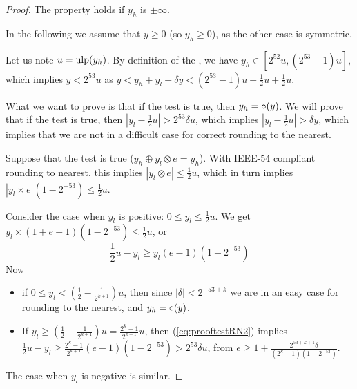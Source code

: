 \begin{proof}
  
  
  The property holds if $y_h$ is $\pm \infty$.
  
  In the following we assume that $y\ge0$ (so $y_h\ge0$), as the other
  case is symmetric.
  
  Let us note $u=\mbox{ulp}(y_h)$. By definition of the \ulp, we have $y_h
  \in [2^{52}u, (2^{53}-1)u]$, which implies $y<2^{53}u$ as $y < y_h + y_l + \delta y
  < (2^{53}-1)u +\frac{1}{2}u +\frac{1}{2}u$.



  
  What we want to prove is that if the test is true, then $y_h =
  \circ(y)$. We will prove that  if the test is true, then $|y_l-\frac{1}{2}u| > 2^{53}\delta
  u$, which implies $|y_l-\frac{1}{2}u| > \delta y$, which implies
  that we are not in a difficult case for correct rounding to the
  nearest.

  Suppose that the test is true ($y_h \oplus y_l \otimes e = y_h$). 
  With IEEE-54 compliant rounding to
  nearest, this implies $|y_l \otimes e|
  \le \frac{1}{2}u$, which in turn implies $|y_l \times e|
  (1-2^{-53}) \le \frac{1}{2}u$. 
  
  Consider the case when $y_l$ is positive:  $0\le y_l \le \frac{1}{2}u$.
  We get $y_l \times (1+e-1)(1-2^{-53}) \le \frac{1}{2}u$, or
  \begin{equation}
  \frac{1}{2}u - y_l \ge y_l (e-1)(1-2^{-53})\label{eq:prooftestRN2}
  \end{equation}  
  Now
  \begin{itemize}
  \item if $0 \le y_l < (\frac{1}{2} - \frac{1}{2^{k+1}})u$, then since
    $|\delta|<2^{-53+k}$ we are in an easy case for rounding to the
    nearest, and $y_h = \circ(y)$.
  \item If $y_l \ge (\frac{1}{2} - \frac{1}{2^{k+1}})u =
    \frac{2^{k}-1}{2^{k+1}}u$, then (\ref{eq:prooftestRN2}) implies
    $\frac{1}{2}u - y_l \ge \frac{2^{k}-1}{2^{k+1}} (e-1)(1-2^{-53}) >
    2^{53}\delta u$, from $e\ge 1+
    \frac{2^{53+k+1}\delta}{(2^{k}-1)(1-2^{-53})}$.
\end{itemize}  
  The case when $y_l$ is negative is similar.
\end{proof}



